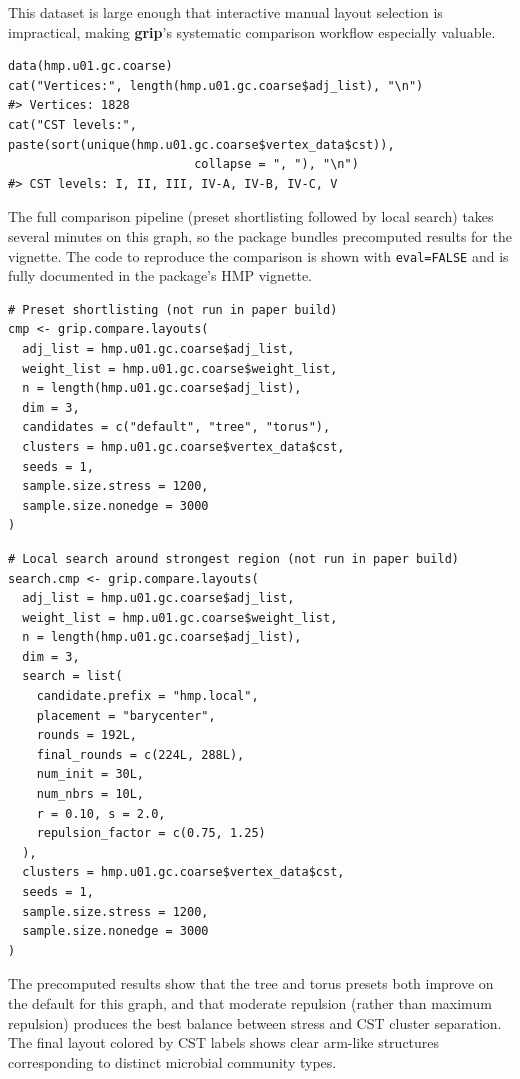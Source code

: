 This dataset is large enough that interactive manual layout selection is
impractical, making \textbf{grip}'s systematic comparison workflow especially
valuable.

\begin{verbatim}
data(hmp.u01.gc.coarse)
cat("Vertices:", length(hmp.u01.gc.coarse$adj_list), "\n")
#> Vertices: 1828
cat("CST levels:", paste(sort(unique(hmp.u01.gc.coarse$vertex_data$cst)),
                          collapse = ", "), "\n")
#> CST levels: I, II, III, IV-A, IV-B, IV-C, V
\end{verbatim}

The full comparison pipeline (preset shortlisting followed by local search)
takes several minutes on this graph, so the package bundles precomputed
results for the vignette. The code to reproduce the comparison is shown with
\texttt{eval=FALSE} and is fully documented in the package's HMP vignette.

\begin{verbatim}
# Preset shortlisting (not run in paper build)
cmp <- grip.compare.layouts(
  adj_list = hmp.u01.gc.coarse$adj_list,
  weight_list = hmp.u01.gc.coarse$weight_list,
  n = length(hmp.u01.gc.coarse$adj_list),
  dim = 3,
  candidates = c("default", "tree", "torus"),
  clusters = hmp.u01.gc.coarse$vertex_data$cst,
  seeds = 1,
  sample.size.stress = 1200,
  sample.size.nonedge = 3000
)
\end{verbatim}

\begin{verbatim}
# Local search around strongest region (not run in paper build)
search.cmp <- grip.compare.layouts(
  adj_list = hmp.u01.gc.coarse$adj_list,
  weight_list = hmp.u01.gc.coarse$weight_list,
  n = length(hmp.u01.gc.coarse$adj_list),
  dim = 3,
  search = list(
    candidate.prefix = "hmp.local",
    placement = "barycenter",
    rounds = 192L,
    final_rounds = c(224L, 288L),
    num_init = 30L,
    num_nbrs = 10L,
    r = 0.10, s = 2.0,
    repulsion_factor = c(0.75, 1.25)
  ),
  clusters = hmp.u01.gc.coarse$vertex_data$cst,
  seeds = 1,
  sample.size.stress = 1200,
  sample.size.nonedge = 3000
)
\end{verbatim}

The precomputed results show that the tree and torus presets both improve on
the default for this graph, and that moderate repulsion (rather than maximum
repulsion) produces the best balance between stress and CST cluster
separation. The final layout colored by CST labels shows clear arm-like
structures corresponding to distinct microbial community types.

